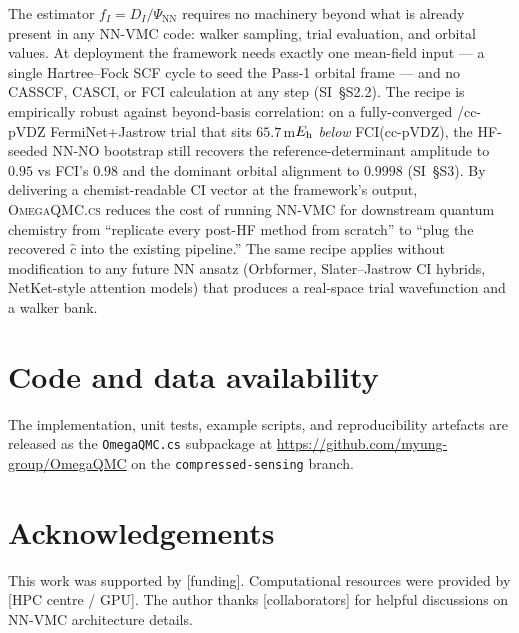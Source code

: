 \documentclass[journal=jctcce,manuscript=article,layout=traditional]{achemso}
\begin{document}
The estimator $f_I = D_I / \Psi_{\mathrm{NN}}$ requires no machinery
beyond what is already present in any NN-VMC code: walker sampling,
trial evaluation, and orbital values. At deployment the framework
needs exactly one mean-field input --- a single Hartree--Fock SCF cycle
to seed the Pass-1 orbital frame --- and no CASSCF, CASCI, or FCI
calculation at any step (SI~\S S2.2). The
recipe is empirically robust against beyond-basis correlation:
on a fully-converged /cc-pVDZ FermiNet+Jastrow trial that
sits $65.7$\,m$E_{\rm h}$ \emph{below} FCI(cc-pVDZ), the
HF-seeded NN-NO bootstrap still recovers the reference-determinant
amplitude to $0.95$ vs FCI's $0.98$ and the dominant orbital
alignment to $0.9998$ (SI~\S S3).
By delivering a chemist-readable
CI vector at the framework's output, \textsc{OmegaQMC.cs} reduces the
cost of running NN-VMC for downstream quantum chemistry from
``replicate every post-HF method from scratch'' to ``plug the recovered
$\widehat c$ into the existing pipeline.'' The same recipe applies
without modification to any future NN ansatz (Orbformer, Slater--Jastrow
CI hybrids, NetKet-style attention models) that produces a real-space
trial wavefunction and a walker bank.

\section*{Code and data availability}

The implementation, unit tests, example scripts, and reproducibility
artefacts are released as the \texttt{OmegaQMC.cs} subpackage at
\url{https://github.com/myung-group/OmegaQMC}
on the \texttt{compressed-sensing} branch.

\section*{Acknowledgements}

This work was supported by [funding]. Computational resources were
provided by [HPC centre / GPU]. The author thanks [collaborators] for
helpful discussions on NN-VMC architecture details.


\end{document}
